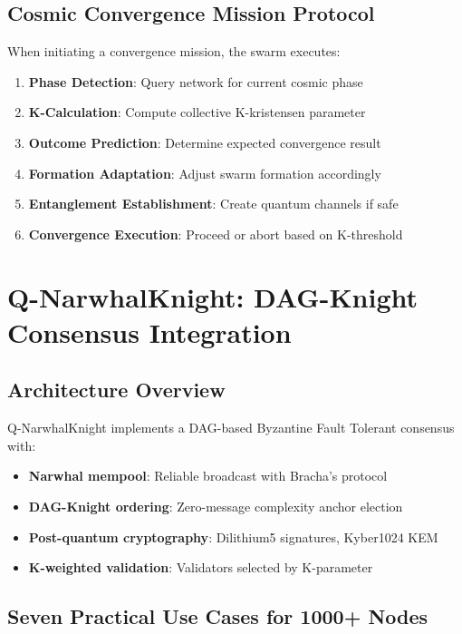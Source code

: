 \documentclass[12pt,a4paper]{article}
\begin{document}
\subsection{Cosmic Convergence Mission Protocol}

When initiating a convergence mission, the swarm executes:

\begin{enumerate}
    \item \textbf{Phase Detection}: Query network for current cosmic phase
    \item \textbf{K-Calculation}: Compute collective K-kristensen parameter
    \item \textbf{Outcome Prediction}: Determine expected convergence result
    \item \textbf{Formation Adaptation}: Adjust swarm formation accordingly
    \item \textbf{Entanglement Establishment}: Create quantum channels if safe
    \item \textbf{Convergence Execution}: Proceed or abort based on K-threshold
\end{enumerate}

\section{Q-NarwhalKnight: DAG-Knight Consensus Integration}

\subsection{Architecture Overview}

Q-NarwhalKnight implements a DAG-based Byzantine Fault Tolerant consensus with:
\begin{itemize}
    \item \textbf{Narwhal mempool}: Reliable broadcast with Bracha's protocol
    \item \textbf{DAG-Knight ordering}: Zero-message complexity anchor election
    \item \textbf{Post-quantum cryptography}: Dilithium5 signatures, Kyber1024 KEM
    \item \textbf{K-weighted validation}: Validators selected by K-parameter
\end{itemize}

\subsection{Seven Practical Use Cases for 1000+ Nodes}
\end{document}
